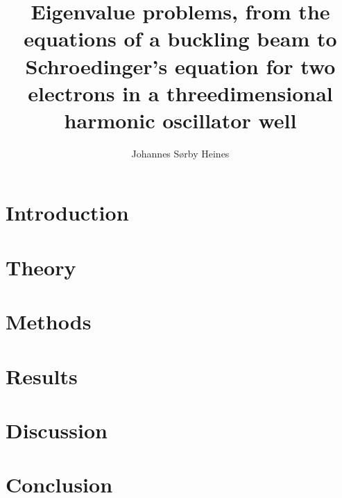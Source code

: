 \documentclass[a4paper,10pt,twocolumn]{article}
\title{Eigenvalue problems, from the equations of a buckling beam
to Schroedinger’s equation for two electrons in a threedimensional
harmonic oscillator well}
\author{Johannes Sørby Heines}
\begin{document}
\twocolumn[
\begin{@twocolumnfalse}
\maketitle
\begin{abstract}

\end{abstract}
\end{@twocolumnfalse}
]

\section{Introduction}


%
%
%
\section{Theory}



%
%
%
\section{Methods}


%
%
%
\section{Results}


%
%
%
\section{Discussion}

%
%
%
\section{Conclusion}



\onecolumn
\begin{thebibliography}{9}


\end{thebibliography}



\end{document}
